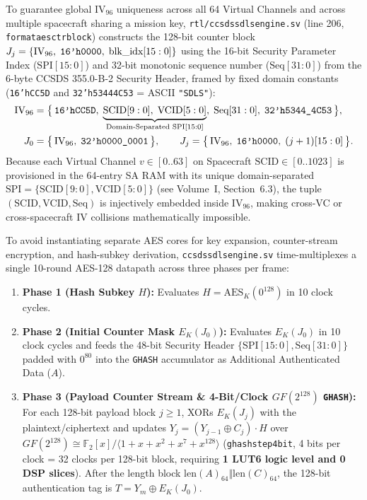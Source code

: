 \documentclass[10pt,a4paper]{article}
\renewcommand{\_}{\origunderscore\penalty0\hskip0pt\relax}
\numberwithin{equation}{section}
\numberwithin{table}{section}
\numberwithin{figure}{section}
\begin{document}
To guarantee global $\text{IV}_{96}$ uniqueness across all 64 Virtual Channels and across multiple spacecraft sharing a mission key, \texttt{rtl/ccsds\_sdls\_engine.sv} (line 206, \texttt{format\_aes\_ctr\_block}) constructs the 128-bit counter block $J_j = \{\text{IV}_{96},\; \texttt{16'h0000},\; \text{blk\_idx}[15:0]\}$ using the 16-bit Security Parameter Index ($\text{SPI}[15:0]$) and 32-bit monotonic sequence number ($\text{Seq}[31:0]$) from the 6-byte CCSDS 355.0-B-2 Security Header, framed by fixed domain constants (\texttt{16'hCC5D} and \texttt{32'h5344\_4C53} = ASCII \texttt{"SDLS"}):
\begin{equation}
\begin{aligned}
  \text{IV}_{96} &= \big\{\,\texttt{16'hCC5D},\; \underbrace{\text{SCID}[9:0],\; \text{VCID}[5:0]}_{\text{Domain-Separated }\text{SPI}[15:0]},\; \text{Seq}[31:0],\; \texttt{32'h5344\_4C53}\,\big\}, \\
  J_0 &= \big\{\,\text{IV}_{96},\; \texttt{32'h0000\_0001}\,\big\}, \qquad J_j = \big\{\,\text{IV}_{96},\; \texttt{16'h0000},\; (j+1)[15:0]\,\big\}.
\end{aligned}
\end{equation}
Because each Virtual Channel $v \in [0..63]$ on Spacecraft $\text{SCID} \in [0..1023]$ is provisioned in the 64-entry SA RAM with its unique domain-separated $\text{SPI} = \{\text{SCID}[9:0], \text{VCID}[5:0]\}$ (see Volume~I, Section~6.3), the tuple $(\text{SCID}, \text{VCID}, \text{Seq})$ is injectively embedded inside $\text{IV}_{96}$, making cross-VC or cross-spacecraft IV collisions mathematically impossible.

To avoid instantiating separate AES cores for key expansion, counter-stream encryption, and hash-subkey derivation, \texttt{ccsds\_sdls\_engine.sv} time-multiplexes a single 10-round AES-128 datapath across three phases per frame:
\begin{enumerate}\setlength{\itemsep}{2pt}
  \item \textbf{Phase 1 (Hash Subkey $H$):} Evaluates $H = \text{AES}_K(0^{128})$ in 10 clock cycles.
  \item \textbf{Phase 2 (Initial Counter Mask $E_K(J_0)$):} Evaluates $E_K(J_0)$ in 10 clock cycles and feeds the 48-bit Security Header $\{\text{SPI}[15:0], \text{Seq}[31:0]\}$ padded with $0^{80}$ into the \texttt{GHASH} accumulator as Additional Authenticated Data ($A$).
  \item \textbf{Phase 3 (Payload Counter Stream \& 4-Bit/Clock $GF(2^{128})$ \texttt{GHASH}):} For each 128-bit payload block $j \ge 1$, XORs $E_K(J_j)$ with the plaintext/ciphertext and updates $Y_j = (Y_{j-1} \oplus C_j) \cdot H$ over $GF(2^{128}) \cong \mathbb{F}_2[x]/\langle 1 + x + x^2 + x^7 + x^{128}\rangle$ (\texttt{ghash\_step\_4bit}, 4 bits per clock = 32 clocks per 128-bit block, requiring \textbf{1 LUT6 logic level and 0 DSP slices}). After the length block $\text{len}(A)_{64} \Vert \text{len}(C)_{64}$, the 128-bit authentication tag is $T = Y_m \oplus E_K(J_0)$.
\end{enumerate}
\end{document}
